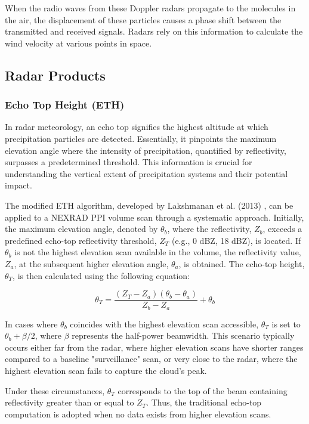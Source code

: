 When the radio waves from these Doppler radars propagate to the molecules in the
air, the displacement of these particles causes a phase shift between the
transmitted and received signals. Radars rely on this information to calculate
the wind velocity at various points in space.

\subsection{Radar Products}



\subsubsection{Echo Top Height (ETH)}

In radar meteorology, an echo top signifies the highest altitude at which
precipitation particles are detected. Essentially, it pinpoints the maximum
elevation angle where the intensity of precipitation, quantified by
reflectivity, surpasses a predetermined threshold. This information is crucial
for understanding the vertical extent of precipitation systems and their
potential impact.

The modified ETH algorithm, developed by Lakshmanan et al. (2013)
\cite{lakshmanan2013}, can be applied to a NEXRAD PPI volume scan through a
systematic approach. Initially, the maximum elevation angle, denoted by
$\theta_{b}$, where the reflectivity, $Z_{b}$, exceeds a predefined echo-top
reflectivity threshold, $Z_T$ (e.g., 0 dBZ, 18 dBZ), is located. If $\theta_{b}$
is not the highest elevation scan available in the volume, the reflectivity
value, $Z_{a}$, at the subsequent higher elevation angle, $\theta_{a}$, is
obtained. The echo-top height, $\theta_T$, is then calculated using the
following equation:

\[ \theta_T = \frac{(Z_T - Z_a)(\theta_b - \theta_a)}{Z_b - Z_a} + \theta_b \]

In cases where $\theta_{b}$ coincides with the highest elevation scan
accessible, $\theta_{T}$ is set to $\theta_{b} + \beta/2$, where $\beta$
represents the half-power beamwidth. This scenario typically occurs either far
from the radar, where higher elevation scans have shorter ranges compared to a
baseline "surveillance" scan, or very close to the radar, where the highest
elevation scan fails to capture the cloud's peak.

Under these circumstances, $\theta_{T}$ corresponds to the top of the beam
containing reflectivity greater than or equal to $Z_T$. Thus, the traditional
echo-top computation is adopted when no data exists from higher elevation scans.


